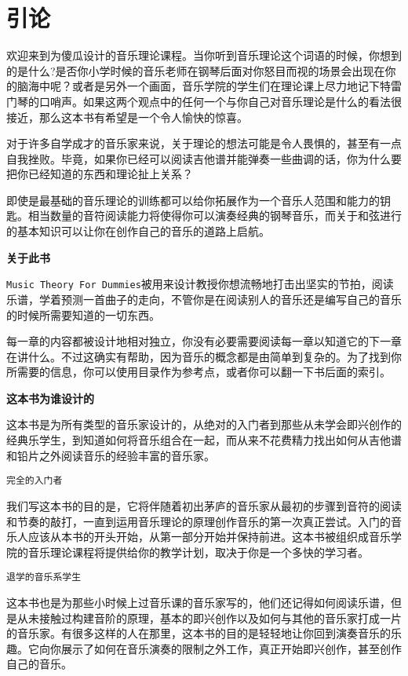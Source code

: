 \chapter{引论}
\thispagestyle{empty}

欢迎来到为傻瓜设计的音乐理论课程。当你听到音乐理论这个词语的时候，你想到的是什么?是否你小学时候的音乐老师在钢琴后面对你怒目而视的场景会出现在你的脑海中呢？或者是另外一个画面，音乐学院的学生们在理论课上尽力地记下特雷门琴的口哨声。如果这两个观点中的任何一个与你自己对音乐理论是什么的看法很接近，那么这本书有希望是一个令人愉快的惊喜。

对于许多自学成才的音乐家来说，关于理论的想法可能是令人畏惧的，甚至有一点自我挫败。毕竟，如果你已经可以阅读吉他谱并能弹奏一些曲调的话，你为什么要把你已经知道的东西和理论扯上关系？

即使是最基础的音乐理论的训练都可以给你拓展作为一个音乐人范围和能力的钥匙。相当数量的音符阅读能力将使得你可以演奏经典的钢琴音乐，而关于和弦进行的基本知识可以让你在创作自己的音乐的道路上启航。

\textbf{关于此书}

\texttt{Music Theory For Dummies}被用来设计教授你想流畅地打击出坚实的节拍，阅读乐谱，学着预测一首曲子的走向，不管你是在阅读别人的音乐还是编写自己的音乐的时候所需要知道的一切东西。

每一章的内容都被设计地相对独立，你没有必要需要阅读每一章以知道它的下一章在讲什么。不过这确实有帮助，因为音乐的概念都是由简单到复杂的。为了找到你所需要的信息，你可以使用目录作为参考点，或者你可以翻一下书后面的索引。

\textbf{这本书为谁设计的}

这本书是为所有类型的音乐家设计的，从绝对的入门者到那些从未学会即兴创作的经典乐学生，到知道如何将音乐组合在一起，而从来不花费精力找出如何从吉他谱和铅片之外阅读音乐的经验丰富的音乐家。

\texttt{完全的入门者}

我们写这本书的目的是，它将伴随着初出茅庐的音乐家从最初的步骤到音符的阅读和节奏的敲打，一直到运用音乐理论的原理创作音乐的第一次真正尝试。入门的音乐人应该从本书的开头开始，从第一部分开始并保持前进。这本书被组织成音乐学院的音乐理论课程将提供给你的教学计划，取决于你是一个多快的学习者。

\texttt{退学的音乐系学生}

这本书也是为那些小时候上过音乐课的音乐家写的，他们还记得如何阅读乐谱，但是从未接触过构建音阶的原理，基本的即兴创作以及如何与其他的音乐家打成一片的音乐家。有很多这样的人在那里，这本书的目的是轻轻地让你回到演奏音乐的乐趣。它向你展示了如何在音乐演奏的限制之外工作，真正开始即兴创作，甚至创作自己的音乐。

